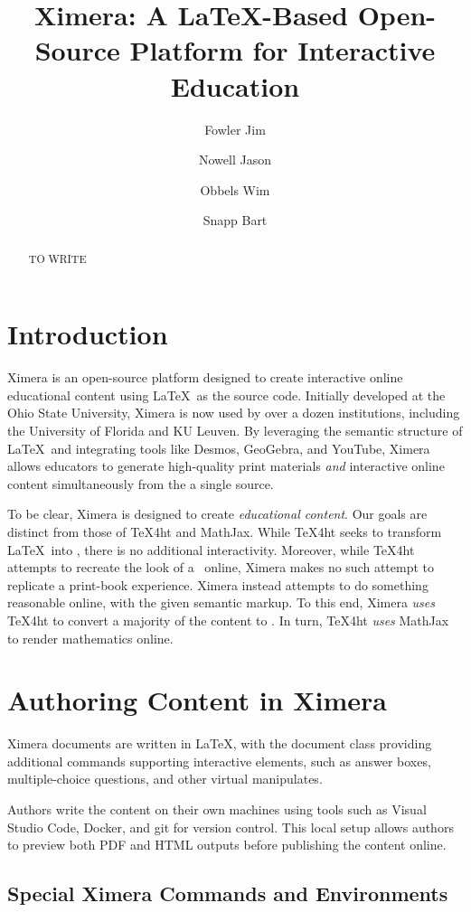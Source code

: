 \documentclass{ltugboat}
\title{Ximera: A \LaTeX{-}Based Open-Source Platform for Interactive
    Education}
\author{Fowler Jim}
\author{Nowell Jason}
\author{Obbels Wim}
\author{Snapp Bart}
\begin{document}
\maketitle

\begin{abstract}
    TO WRITE
\end{abstract}

\section{Introduction}

Ximera is an open-source platform designed to create interactive online
educational
content using \LaTeX\ as the source code. Initially developed at the Ohio State
University, Ximera is now used by over a dozen institutions, including
the University of Florida and KU Leuven. By leveraging the semantic structure
of \LaTeX\ and integrating tools like Desmos, GeoGebra, and YouTube, Ximera
allows educators to generate high-quality print materials \emph{and}
interactive online content simultaneously from the a single source.

To be clear, Ximera is designed to create \emph{educational content}. Our goals
are distinct from those of \TeX4ht and MathJax. While \TeX4ht seeks to
transform \LaTeX\ into \HTML, there is no additional interactivity. Moreover,
while \TeX4ht attempts to recreate the look of a \PDF\ online,
Ximera makes no such attempt to replicate a print-book experience. Ximera
instead attempts to do something reasonable
online, with the given semantic markup. To this end,
Ximera \emph{uses} \TeX4ht to convert a majority of the content to \HTML. In
turn,
\TeX4ht \emph{uses} MathJax to render mathematics online.

\section{Authoring Content in Ximera}

Ximera documents are written in \LaTeX, with the document class providing
additional
commands supporting interactive elements, such as answer boxes,
multiple-choice questions, and other virtual manipulates.

Authors write the content on their own machines using tools such as Visual
Studio Code, Docker, and git for
version control. This local setup allows authors to preview both PDF and HTML
outputs before publishing the content online.

\subsection{Special Ximera Commands and Environments}
\end{document}

